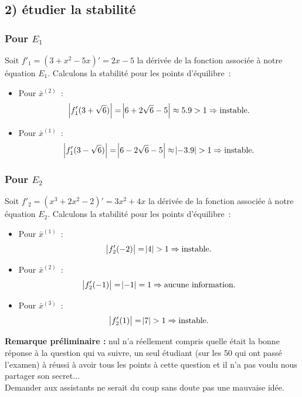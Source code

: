 \documentclass[11pt,a4paper]{report}
\begin{document}
		\subsection*{2) étudier la stabilité}
		\subsubsection*{Pour $E_1$}
				Soit $f'_1 = (3 + x^2 -5x)' = 2x-5$ la dérivée de la fonction associée à notre équation $E_1$. Calculons la stabilité pour les points d'équilibre~:
				\begin{itemize}
					\item Pour $\bar x^{(2)}$~:
						\[
							\abs {f'_1(3 + \sqrt{6})} = \abs {6 + 2\sqrt{6} - 5} \approx 5.9 > 1 \Rightarrow \text{instable}.
						\]
					\item Pour $\bar x^{(1)}$~:
						\[
							\abs {f'_1(3 - \sqrt{6})} = \abs {6 - 2\sqrt{6} - 5} \approx \abs {-3.9} > 1 \Rightarrow \text{instable}.
						\]
				\end{itemize}

			\subsubsection*{Pour $E_2$}
				Soit $f'_2 = (x^3 + 2x^2 - 2)' = 3x^2 + 4x$ la dérivée de la fonction associée à notre équation $E_2$. Calculons la stabilité pour les points d'équilibre~:
				\begin{itemize}
					\item Pour $\bar x^{(1)}$~:
						\[
							\abs {f'_2(-2)} = \abs 4 > 1 \Rightarrow \text{instable}.
						\]
					\item Pour $\bar x^{(2)}$~:
						\[
							\abs {f'_2(-1)} = \abs {-1} = 1 \Rightarrow \text{aucune information}.
						\]
					\item Pour $\bar x^{(3)}$~:
						\[
							\abs {f'_2(1)} = \abs 7 > 1 \Rightarrow \text{instable}.
						\]
				\end{itemize}

	\pagebreak
	\textbf{Remarque préliminaire : } nul n'a réellement compris quelle était la bonne réponse à la question qui va suivre, un seul étudiant (sur les 50 qui ont passé l'examen) à réussi à avoir tous les points à cette question et il n'a pas voulu nous partager son secret...\\  %
	Demander aux assistants ne serait du coup sans doute pas une mauvaise idée.
\end{document}
